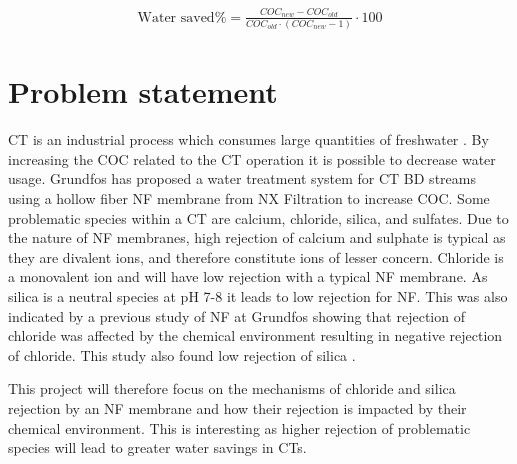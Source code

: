 \begin{ceqn}
    \begin{align}
     \textrm{Water saved} \% = \frac{COC_{new}-COC_{old}}{COC_{old}\cdot(COC_{new}-1)}\cdot 100
     \label{eq:COC_water_saved}
    \end{align}
\end{ceqn}


\section{Problem statement}



CT is an industrial process which consumes large quantities of freshwater \citep{farahanniRecoveryCoolingTower_2016}. 
By increasing the COC related to the CT operation it is possible to decrease water usage. \citep{PracticalApproachWater2007}
Grundfos has proposed a water treatment system for CT BD streams using a hollow fiber NF membrane from NX Filtration to increase COC. 
Some problematic species within a CT are calcium, chloride, silica, and sulfates. 
Due to the nature of NF membranes, %
high rejection of calcium and sulphate is typical as they are divalent ions, and therefore constitute ions of lesser concern.  
Chloride is a monovalent ion and will have low rejection with a typical NF membrane. \citep{nanofiltration_2021_bog_fraMorten}  %
As silica is a neutral species at pH 7-8 \citep{ChemistrySilicaScale2014} it leads to low rejection for NF.
This was also indicated by a previous study of NF at Grundfos  \citep{Sebastians_master_2020} showing that rejection of chloride was affected by the chemical environment resulting in negative rejection of chloride. 
This study also found low rejection of silica  \citep{Sebastians_master_2020}. 

This project will therefore focus on the mechanisms of chloride and silica rejection by an NF membrane and how their rejection is impacted by their chemical environment.
This is interesting as higher rejection of problematic species will lead to greater water savings in CTs.




